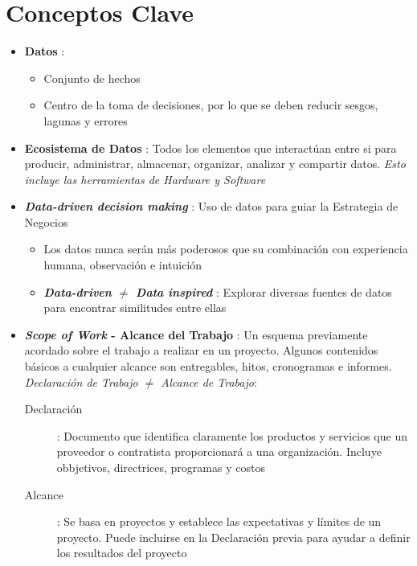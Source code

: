 \section{Conceptos Clave}
\begin{itemize}
    \item {\textbf{Datos} : 
    \begin{itemize}
        \item {Conjunto de hechos}
        \item {Centro de la toma de decisiones, por lo que se deben reducir sesgos, lagunas y errores}
    \end{itemize}}
    \item {\textbf{Ecosistema de Datos} : Todos los elementos que interactúan entre si para producir, administrar, almacenar, organizar, analizar y compartir datos. \textit{Esto incluye las herramientas de Hardware y Software}}
    \item {\textbf{\textit{Data-driven decision making}} : Uso de datos para guiar la Estrategia de Negocios 
    \begin{itemize}
        \item {Los datos nunca serán más poderosos que su combinación con experiencia humana, observación e intuición}
        \item {\textit{\textbf{Data-driven ${\neq}$ Data inspired}} : Explorar diversas fuentes de datos para encontrar similitudes entre ellas}
    \end{itemize}}
    \item {\textbf{\textit{Scope of Work} - Alcance del Trabajo} : Un esquema previamente acordado sobre el trabajo a realizar en un proyecto. Algunos contenidos básicos a cualquier alcance son entregables, hitos, cronogramas e informes. \textit{Declaración de Trabajo ${\neq}$ Alcance de Trabajo}:
    \begin{description}
        \item[Declaración]{ : Documento que identifica claramente los productos y servicios que un proveedor o contratista proporcionará a una organización. Incluye obbjetivos, directrices, programas y costos}
        \item[Alcance]{ : Se basa en proyectos y establece las expectativas y límites de un proyecto. Puede incluirse en la Declaración previa para ayudar a definir los resultados del proyecto}
    \end{description}}
\end{itemize}

\newpage